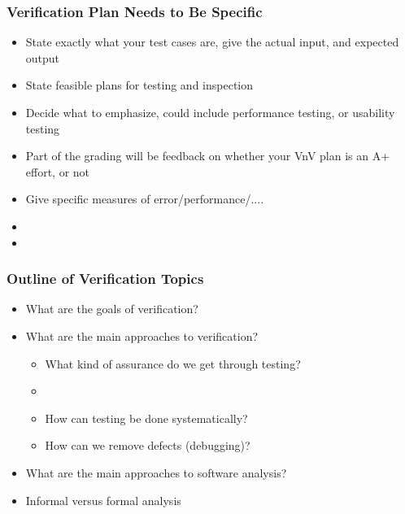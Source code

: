 \documentclass[t,12pt,numbers,fleqn]{beamer}
\begin{document}

\begin{frame}
\frametitle{Verification Plan Needs to Be Specific}

\begin{itemize}
\item State exactly what your test cases are, give the actual input, and
  expected output
\item State feasible plans for testing and inspection
\item Decide what to emphasize, could include performance testing, or usability
  testing
\item Part of the grading will be feedback on whether your VnV plan is an A+
  effort, or not
\item Give specific measures of error/performance/....
\item {}
\item {}     
\end{itemize}
  
\end{frame}


\begin{frame}
\frametitle{Outline of Verification Topics}

\begin{itemize}

\item What are the goals of verification?
\item What are the main approaches to verification?
\begin{itemize}
\item What kind of assurance do we get through testing?  
\item {}
\item How can testing be done systematically?
\item How can we remove defects (debugging)?
\end{itemize}
\item What are the main approaches to software analysis?
\item Informal versus formal analysis

\end{itemize}

\end{frame}
\end{document}
